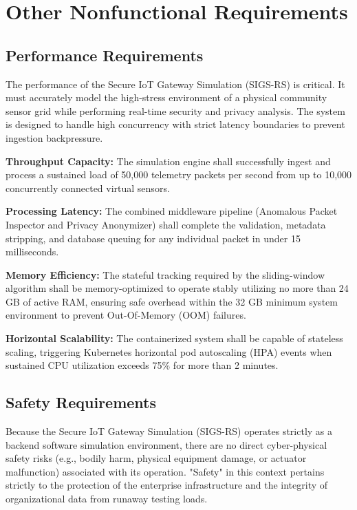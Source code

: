 \documentclass[12pt,letterpaper]{article}
\begin{document}
\section{Other Nonfunctional Requirements}
\subsection{Performance Requirements}
The performance of the Secure IoT Gateway Simulation (SIGS-RS) is critical. It must accurately model the high-stress environment of a physical community sensor grid while performing real-time security and privacy analysis. The system is designed to handle high concurrency with strict latency boundaries to prevent ingestion backpressure.

\vspace{0.08in}
\noindent\hspace*{0.94in} \textbf{Throughput Capacity:} The simulation engine shall successfully ingest and process a sustained load of 50,000 telemetry packets per second from up to 10,000 concurrently connected virtual sensors.\par
\vspace{0.04in}
\noindent\hspace*{0.94in} \textbf{Processing Latency:} The combined middleware pipeline (Anomalous Packet Inspector and Privacy Anonymizer) shall complete the validation, metadata stripping, and database queuing for any individual packet in under 15 milliseconds.\par
\vspace{0.04in}
\noindent\hspace*{0.94in} \textbf{Memory Efficiency:} The stateful tracking required by the sliding-window algorithm shall be memory-optimized to operate stably utilizing no more than 24 GB of active RAM, ensuring safe overhead within the 32 GB minimum system environment to prevent Out-Of-Memory (OOM) failures.\par
\vspace{0.04in}
\noindent\hspace*{0.94in} \textbf{Horizontal Scalability:} The containerized system shall be capable of stateless scaling, triggering Kubernetes horizontal pod autoscaling (HPA) events when sustained CPU utilization exceeds 75\% for more than 2 minutes.\par
\subsection{Safety Requirements}
Because the Secure IoT Gateway Simulation (SIGS-RS) operates strictly as a backend software simulation environment, there are no direct cyber-physical safety risks (e.g., bodily harm, physical equipment damage, or actuator malfunction) associated with its operation. "Safety" in this context pertains strictly to the protection of the enterprise infrastructure and the integrity of organizational data from runaway testing loads.
\end{document}

